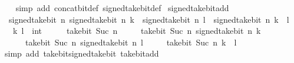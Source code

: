 \begin{isabellebody}
%
\isadelimproof
\ \ %
\endisadelimproof
%
\isatagproof
{}\isamarkupfalse%
\ {\isacharparenleft}{\kern0pt}simp\ add{\isacharcolon}{\kern0pt}\ concat{\isacharunderscore}{\kern0pt}bit{\isacharunderscore}{\kern0pt}def\ signed{\isacharunderscore}{\kern0pt}take{\isacharunderscore}{\kern0pt}bit{\isacharunderscore}{\kern0pt}def{\isacharparenright}{\kern0pt}%
\endisatagproof
{\isafoldproof}%
%
\isadelimproof
\isanewline
%
\endisadelimproof
\isanewline
{}\isamarkupfalse%
\ signed{\isacharunderscore}{\kern0pt}take{\isacharunderscore}{\kern0pt}bit{\isacharunderscore}{\kern0pt}add{\isacharcolon}{\kern0pt}\isanewline
\ \ {\isacartoucheopen}signed{\isacharunderscore}{\kern0pt}take{\isacharunderscore}{\kern0pt}bit\ n\ {\isacharparenleft}{\kern0pt}signed{\isacharunderscore}{\kern0pt}take{\isacharunderscore}{\kern0pt}bit\ n\ k\ {\isacharplus}{\kern0pt}\ signed{\isacharunderscore}{\kern0pt}take{\isacharunderscore}{\kern0pt}bit\ n\ l{\isacharparenright}{\kern0pt}\ {\isacharequal}{\kern0pt}\ signed{\isacharunderscore}{\kern0pt}take{\isacharunderscore}{\kern0pt}bit\ n\ {\isacharparenleft}{\kern0pt}k\ {\isacharplus}{\kern0pt}\ l{\isacharparenright}{\kern0pt}{\isacartoucheclose}\isanewline
\ \ \ k\ l\ {\isacharcolon}{\kern0pt}{\isacharcolon}{\kern0pt}\ int\isanewline
%
\isadelimproof
%
\endisadelimproof
%
\isatagproof
{}\isamarkupfalse%
\ {\isacharminus}{\kern0pt}\isanewline
\ \ \isamarkupfalse%
\ {\isacartoucheopen}take{\isacharunderscore}{\kern0pt}bit\ {\isacharparenleft}{\kern0pt}Suc\ n{\isacharparenright}{\kern0pt}\isanewline
\ \ \ \ \ {\isacharparenleft}{\kern0pt}take{\isacharunderscore}{\kern0pt}bit\ {\isacharparenleft}{\kern0pt}Suc\ n{\isacharparenright}{\kern0pt}\ {\isacharparenleft}{\kern0pt}signed{\isacharunderscore}{\kern0pt}take{\isacharunderscore}{\kern0pt}bit\ n\ k{\isacharparenright}{\kern0pt}\ {\isacharplus}{\kern0pt}\isanewline
\ \ \ \ \ \ take{\isacharunderscore}{\kern0pt}bit\ {\isacharparenleft}{\kern0pt}Suc\ n{\isacharparenright}{\kern0pt}\ {\isacharparenleft}{\kern0pt}signed{\isacharunderscore}{\kern0pt}take{\isacharunderscore}{\kern0pt}bit\ n\ l{\isacharparenright}{\kern0pt}{\isacharparenright}{\kern0pt}\ {\isacharequal}{\kern0pt}\isanewline
\ \ \ \ take{\isacharunderscore}{\kern0pt}bit\ {\isacharparenleft}{\kern0pt}Suc\ n{\isacharparenright}{\kern0pt}\ {\isacharparenleft}{\kern0pt}k\ {\isacharplus}{\kern0pt}\ l{\isacharparenright}{\kern0pt}{\isacartoucheclose}\isanewline
\ \ \ \ \isamarkupfalse%
\ {\isacharparenleft}{\kern0pt}simp\ add{\isacharcolon}{\kern0pt}\ take{\isacharunderscore}{\kern0pt}bit{\isacharunderscore}{\kern0pt}signed{\isacharunderscore}{\kern0pt}take{\isacharunderscore}{\kern0pt}bit\ take{\isacharunderscore}{\kern0pt}bit{\isacharunderscore}{\kern0pt}add{\isacharparenright}{\kern0pt}\isanewline

\end{isabellebody}
